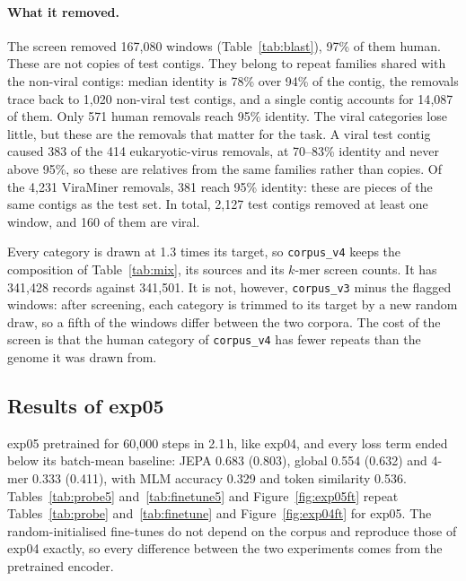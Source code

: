 \documentclass[10pt,twocolumn,a4paper]{article}
\begin{document}
\paragraph{What it removed.} The screen removed 167{,}080 windows
(Table~\ref{tab:blast}), 97\% of them human. These are not copies of test contigs.
They belong to repeat families shared with the non-viral contigs: median identity
is 78\% over 94\% of the contig, the removals trace back to 1{,}020 non-viral test
contigs, and a single contig accounts for 14{,}087 of them. Only 571 human
removals reach 95\% identity. The viral categories lose little, but these are the
removals that matter for the task. A viral test contig caused 383 of the 414
eukaryotic-virus removals, at 70--83\% identity and never above 95\%, so these are
relatives from the same families rather than copies. Of the 4{,}231 ViraMiner
removals, 381 reach 95\% identity: these are pieces of the same contigs as the
test set. In total, 2{,}127 test contigs removed at least one window, and 160 of
them are viral.

Every category is drawn at 1.3 times its target, so \texttt{corpus\_v4} keeps the
composition of Table~\ref{tab:mix}, its sources and its $k$-mer screen counts. It
has 341{,}428 records against 341{,}501. It is not, however, \texttt{corpus\_v3}
minus the flagged windows: after screening, each category is trimmed to its
target by a new random draw, so a fifth of the windows differ between the two
corpora. The cost of the screen is that the human category of \texttt{corpus\_v4}
has fewer repeats than the genome it was drawn from.

\subsection{Results of exp05}\label{sec:exp05:results}

exp05 pretrained for 60{,}000 steps in 2.1\,h, like exp04, and every loss term
ended below its batch-mean baseline: JEPA 0.683 (0.803), global 0.554 (0.632) and
4-mer 0.333 (0.411), with MLM accuracy 0.329 and token similarity 0.536.
Tables~\ref{tab:probe5} and~\ref{tab:finetune5} and Figure~\ref{fig:exp05ft}
repeat Tables~\ref{tab:probe} and~\ref{tab:finetune} and
Figure~\ref{fig:exp04ft} for exp05. The random-initialised fine-tunes do not
depend on the corpus and reproduce those of exp04 exactly, so every difference
between the two experiments comes from the pretrained encoder.
\end{document}
